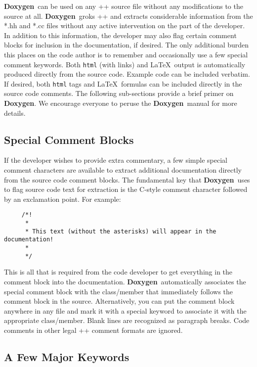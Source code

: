 \documentclass[11pt]{nmemo}
\newcommand{\doxy}{{\normalfont\bfseries Doxygen}}
\begin{document}
\doxy\ can be used on any \C++ source file
without any modifications to the source at all.  
\doxy\ groks \C++ and extracts considerable information from the *.hh
and *.cc files without any active intervention on the part of the developer.
In addition to this information, the developer may also flag certain
comment blocks for inclusion in the documentation, if desired.
The only additional burden this places on the code author is to 
remember and occasionally use a few
special comment keywords. Both \texttt{html} (with links)
and \LaTeX\ output is automatically produced directly from the source code.
Example code can be included verbatim. If desired, both  \texttt{html} tags and \LaTeX\
formulas can be included directly in the source code comments.  The following
sub-sections provide a brief primer on \doxy. We encourage everyone to peruse
the \doxy\ manual for more details.

\subsection{Special Comment Blocks}
\label{sec:spcom}

If the developer wishes to provide extra commentary, 
a few simple special comment characters are available to extract additional 
documentation directly from the source code comment blocks.
The fundamental key that \doxy\ uses to flag source code text for
extraction is the C-style comment character followed by an exclamation
point. For example:
\begin{verbatim}
     /*!
      *
      * This text (without the asterisks) will appear in the documentation!
      *
      */
\end{verbatim}
This is all that is required from the code developer to get everything
in the comment block into the documentation. \doxy\ automatically associates
the special comment block with the class/member that immediately follows the 
comment block in the source. Alternatively, you can put the comment block
anywhere in any file and mark it with a special keyword to associate it
with the appropriate class/member. Blank lines are recognized as paragraph
breaks. Code comments in other legal \C++ comment formats are ignored.

\subsection{A Few Major Keywords}
\end{document}
